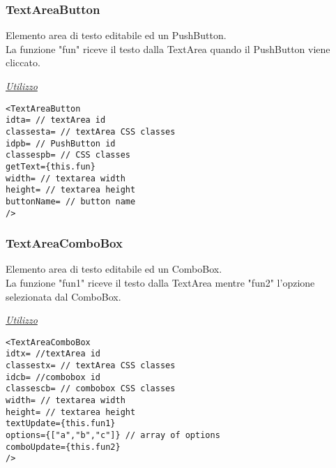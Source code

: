 \subsubsection{TextAreaButton}
Elemento area di testo editabile ed un PushButton.\\
La funzione "fun" riceve il testo dalla TextArea quando il PushButton viene cliccato.
\begin{center}
\underline{\textit{Utilizzo}}
\begin{lstlisting}
<TextAreaButton
idta= // textArea id
classesta= // textArea CSS classes
idpb= // PushButton id
classespb= // CSS classes
getText={this.fun}
width= // textarea width
height= // textarea height
buttonName= // button name
/>
\end{lstlisting}
\end{center}

\subsubsection{TextAreaComboBox}
Elemento area di testo editabile ed un ComboBox.\\
La funzione "fun1" riceve il testo dalla TextArea mentre "fun2" l'opzione selezionata dal ComboBox.
\begin{center}
\underline{\textit{Utilizzo}}
\begin{lstlisting}
<TextAreaComboBox
idtx= //textArea id 
classestx= // textArea CSS classes
idcb= //combobox id 
classescb= // combobox CSS classes
width= // textarea width
height= // textarea height
textUpdate={this.fun1}
options={["a","b","c"]} // array of options
comboUpdate={this.fun2}
/>	
\end{lstlisting}
\end{center}
